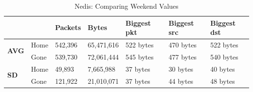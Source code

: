 \begin{table}[H]
    \caption{Nedis: Comparing Weekend Values}
    \begin{tabular}{ll|l|l|l|l|l|}
        \cline{3-7}
        \textbf{}                                           & \textbf{} & \textbf{Packets} & \textbf{Bytes} & \textbf{Biggest pkt} & \textbf{Biggest src} & \textbf{Biggest dst} \\ \hline
        \multicolumn{1}{|l|}{\multirow{2}{*}{\textbf{AVG}}} & Home      & 542,396          & 65,471,616     & 522 bytes            & 470 bytes            & 522 bytes            \\ \cline{2-7} 
        \multicolumn{1}{|l|}{}                              & Gone      & 539,730          & 72,061,444     & 545 bytes            & 477 bytes            & 540 bytes            \\ \hline
        \multicolumn{1}{|l|}{\multirow{2}{*}{\textbf{SD}}}  & Home      & 49,893           & 7,665,988      & 37 bytes             & 30 bytes             & 40 bytes             \\ \cline{2-7} 
        \multicolumn{1}{|l|}{}                              & Gone      & 121,922          & 21,010,071     & 37 bytes             & 44 bytes             & 48 bytes             \\ \hline
    \end{tabular}
    \label{tab:MillWeekends}
\end{table}

